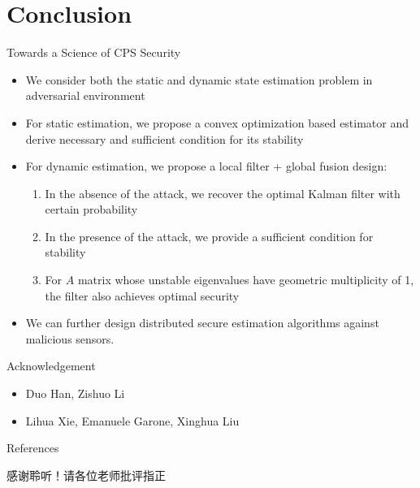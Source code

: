 \documentclass[10pt]{beamer}
\begin{document}
\section{Conclusion}

\begin{frame}{Towards a Science of CPS Security}
  \begin{itemize}
    \item We consider both the static and dynamic state estimation problem in adversarial environment 
    \item For static estimation, we propose a convex optimization based estimator and derive necessary and sufficient condition for its stability
    \item For dynamic estimation, we propose a local filter + global fusion design:
      \begin{enumerate}
	\item In the absence of the attack, we recover the optimal Kalman filter with certain probability
	\item In the presence of the attack, we provide a sufficient condition for stability
	\item For $A$ matrix whose unstable eigenvalues have geometric multiplicity of 1, the filter also achieves optimal security 
      \end{enumerate}
		\item We can further design distributed secure estimation algorithms against malicious sensors.
  \end{itemize}
\end{frame}

\begin{frame}{Acknowledgement}
  \begin{itemize}
    \item Duo Han, Zishuo Li
    \item Lihua Xie, Emanuele Garone, Xinghua Liu
  \end{itemize}
\end{frame}

\begin{frame}[allowframebreaks]{References}
  \nocite{Han2019, Liu2021, Li2022}
      \printbibliography[heading=none]
\end{frame}

\begin{frame}[standout]
  感谢聆听！请各位老师批评指正
\end{frame}
\end{document}
